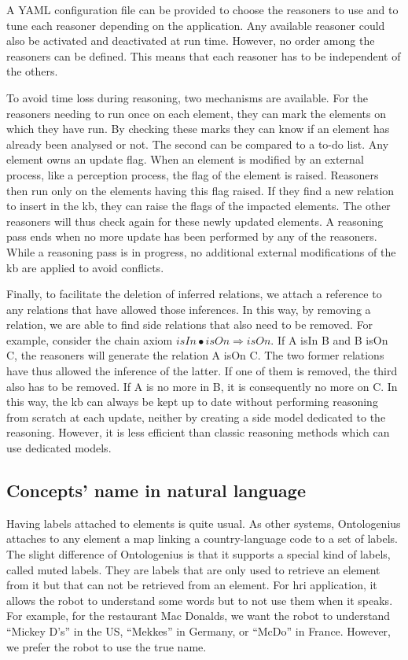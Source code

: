 A YAML configuration file can be provided to choose the reasoners to use and to tune each reasoner depending on the application. Any available reasoner could also be activated and deactivated at run time. However, no order among the reasoners can be defined. This means that each reasoner has to be independent of the others.

To avoid time loss during reasoning, two mechanisms are available. For the reasoners needing to run once on each element, they can mark the elements on which they have run. By checking these marks they can know if an element has already been analysed or not. The second can be compared to a to-do list. Any element owns an update flag. When an element is modified by an external process, like a perception process, the flag of the element is raised. Reasoners then run only on the elements having this flag raised. If they find a new relation to insert in the \acrshort{kb}, they can raise the flags of the impacted elements. The other reasoners will thus check again for these newly updated elements. A reasoning pass ends when no more update has been performed by any of the reasoners. While a reasoning pass is in progress, no additional external modifications of the \acrshort{kb} are applied to avoid conflicts.

Finally, to facilitate the deletion of inferred relations, we attach a reference to any relations that have allowed those inferences. In this way, by removing a relation, we are able to find side relations that also need to be removed. For example, consider the chain axiom $isIn \bullet isOn \Rightarrow isOn$. If A isIn B and B isOn C, the reasoners will generate the relation A isOn C. The two former relations have thus allowed the inference of the latter. If one of them is removed, the third also has to be removed. If A is no more in B, it is consequently no more on C. In this way, the \acrshort{kb} can always be kept up to date without performing reasoning from scratch at each update, neither by creating a side model dedicated to the reasoning. However, it is less efficient than classic reasoning methods which can use dedicated models.

\subsection{Concepts' name in natural language}

Having labels attached to elements is quite usual. As other systems, Ontologenius attaches to any element a map linking a country-language code to a set of labels. The slight difference of Ontologenius is that it supports a special kind of labels, called muted labels. They are labels that are only used to retrieve an element from it but that can not be retrieved from an element. For \acrshort{hri} application, it allows the robot to understand some words but to not use them when it speaks. For example, for the restaurant Mac Donalds, we want the robot to understand ``Mickey D's'' in the US, ``Mekkes'' in Germany, or ``McDo'' in France. However, we prefer the robot to use the true name.

